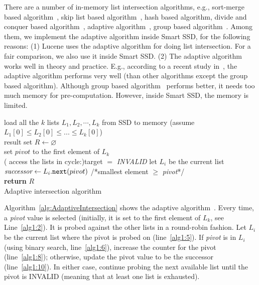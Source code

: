 There are a number of in-memory list intersection algorithms, e.g., sort-merge based algorithm~\cite{GarciaMolina2008}, skip list based algorithm~\cite{M08}, hash based algorithm, divide and conquer based algorithm~\cite{Baezayates05}, adaptive algorithm~\cite{Demaine2000ASI,DLMI01}, group based algorithm~\cite{Ding2011}. Among them, we implement the adaptive algorithm inside Smart SSD, for the following reasons: (1) Lucene uses the adaptive algorithm for doing list intersection. For a fair comparison, we also use it inside Smart SSD. (2) The adaptive algorithm works well in theory and practice. E.g., according to a recent study in~\cite{Ding2011}, the adaptive algorithm performs very well (than other algorithms except the group based algorithm). Although group based algorithm~\cite{Ding2011} performs better, it needs too much memory for pre-computation. However, inside Smart SSD, the memory is limited.

 \begin{algorithm}[htbp]\small
load all the $k$ lists $L_1, L_2, \cdots, L_k$ from SSD to memory (assume $L_1[0] \le L_2[0] \le ... \le L_k[0]$)\\
result set $R \leftarrow \varnothing$\\
set $pivot$ to the first element of $L_k$ \\

 \Repeat( access the lists in cycle:){target $=$ \emph{INVALID}}{
 let $L_i$ be the current list \\
 $\emph{successor} \leftarrow L_i.\texttt{next}(pivot)$ /*smallest element $\ge$ \emph{pivot}*/\\
 }
 \textbf{return} $R$\\
 \caption{Adaptive intersection algorithm}\label{alg:AdaptiveIntersection}
 \end{algorithm}

Algorithm~\ref{alg:AdaptiveIntersection} shows the adaptive algorithm~\cite{Demaine2000ASI,DLMI01}. Every time, a \emph{pivot} value is selected (initially, it is set to the first element of $L_k$, see Line~\ref{alg1:2}). It is probed against the other lists in a round-robin fashion. Let $L_i$ be the current list where the {pivot} is probed on (line~\ref{alg1:5}). If \emph{pivot} is in $L_i$ (using binary search, line~\ref{alg1:6}), increase the counter for the {pivot} (line~\ref{alg1:8}); otherwise, update the {pivot} value to be the successor (line~\ref{alg1:10}). In either case, continue probing the next available list until the pivot is INVALID (meaning that at least one list is exhausted).



